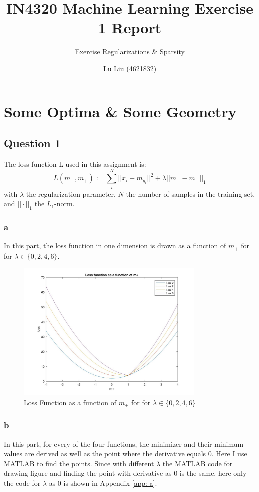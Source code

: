 \documentclass[a4paper]{scrartcl}
\title{IN4320 Machine Learning Exercise 1 Report}
\subtitle{Exercise Regularizations \& Sparsity}
\author{ %
		Lu Liu (4621832)		
		}
\begin{document}
\maketitle

\section{Some Optima \& Some Geometry}
\label{ch:some}

\subsection{ Question 1}
The loss function L used in this assignment is:
$$L(m_-, m_+):=\sum_i^N ||x_i - m_{y_i}||^2 + \lambda||m_- - m_+||_1$$
with $\lambda$ the regularization parameter, $N$ the number of samples in the training set, and $||\cdot||_1$ the $L_1$-norm.

\subsubsection{a}
In this part, the loss function in one dimension is drawn as a function of $m_+$ for for $\lambda \in \{0,2,4,6\}$. 

\begin{figure}[h!]
\centering
\includegraphics[width=9cm]{q1a.jpg}
\caption{Loss Function as a function of $m_+$ for for $\lambda \in \{0,2,4,6\}$}
\label{fig:q1a}
\end{figure}

\subsubsection{b}
In this part, for every of the four functions, the minimizer and their minimum values are derived as well as the point where the derivative equals 0.
Here I use MATLAB to find the points.
Since with different $\lambda$ the MATLAB code for drawing figure and finding the point with derivative as 0 is the same, here only the code for $\lambda$ as 0 is shown in Appendix \ref{app: a}.
\end{document}
